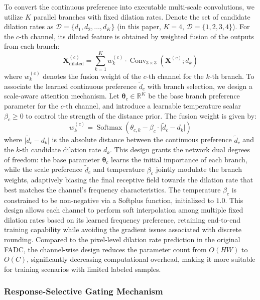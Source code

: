 \documentclass[lettersize,journal]{IEEEtran}
\begin{document}
To convert the continuous preference into executable multi-scale convolutions, we utilize $K$ parallel branches with fixed dilation rates. Denote the set of candidate dilation rates as $\mathcal{D} = \{d_1, d_2, \dots, d_K\}$ (in this paper, $K=4$, $\mathcal{D}=\{1,2,3,4\}$). For the $c$-th channel, its dilated feature is obtained by weighted fusion of the outputs from each branch:
\begin{equation}
\mathbf{X}_{\text{dilated}}^{(c)} = \sum_{k=1}^{K} w_k^{(c)} \cdot \operatorname{Conv}_{3\times3}\left(\mathbf{X}^{(c)}; d_k\right)
\end{equation}
where $w_k^{(c)}$ denotes the fusion weight of the $c$-th channel for the $k$-th branch. To associate the learned continuous preference $\tilde{d}_c$ with branch selection, we design a scale-aware attention mechanism. Let $\boldsymbol{\theta}_c \in \mathbb{R}^K$ be the base branch preference parameter for the $c$-th channel, and introduce a learnable temperature scalar $\beta_c \ge 0$ to control the strength of the distance prior. The fusion weight is given by:
\begin{equation}
w_k^{(c)} = \operatorname{Softmax}\left( \theta_{c,k} - \beta_c \cdot \lvert \tilde{d}_c - d_k \rvert \right)
\end{equation}
where $\lvert \tilde{d}_c - d_k \rvert$ is the absolute distance between the continuous preference $\tilde{d}_c$ and the $k$-th candidate dilation rate $d_k$. This design grants the network dual degrees of freedom: the base parameter $\boldsymbol{\theta}_c$ learns the initial importance of each branch, while the scale preference $\tilde{d}_c$ and temperature $\beta_c$ jointly modulate the branch weights, adaptively biasing the final receptive field towards the dilation rate that best matches the channel's frequency characteristics. The temperature $\beta_c$ is constrained to be non-negative via a Softplus function, initialized to $1.0$. This design allows each channel to perform soft interpolation among multiple fixed dilation rates based on its learned frequency preference, retaining end-to-end training capability while avoiding the gradient issues associated with discrete rounding. Compared to the pixel-level dilation rate prediction in the original FADC, the channel-wise design reduces the parameter count from $O(HW)$ to $O(C)$, significantly decreasing computational overhead, making it more suitable for training scenarios with limited labeled samples.

\subsubsection{Response-Selective Gating Mechanism}
\end{document}
